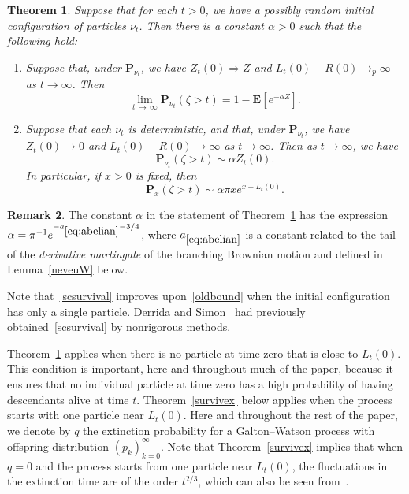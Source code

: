 \documentclass[10pt]{amsart}
\newtheorem{theo}{Theorem}[section]
\theoremstyle{definition}\newtheorem{defi}[theo]{Definition}\newtheorem{rema}[theo]{Remark}\newtheorem{exam}[theo]{Example}\newtheorem{exem}[theo]{Example}\newtheorem{nota}[theo]{Notation}
\newcommand*\E{\mathbf{E}}
\renewcommand*\P{\mathbf{P}}
\newcommand{\1} {\mathds{1}}
\begin{document}
\begin{theo}\label{survival}
Suppose that for each $t > 0$, we have a possibly random initial configuration of particles $\nu_t$. Then there is a constant $\alpha > 0$ such that the following hold:
\begin{enumerate}
\item\label{theo1.1.1} Suppose that, under $\P_{\nu_t}$, we have $Z_t(0) \Rightarrow Z$ and $L_t(0) - R(0) \rightarrow_p \infty$ as $t \rightarrow \infty$. Then
\[
\lim_{t\,\rightarrow\,\infty} \P_{\nu_t}(\zeta > t) = 1 - \E\left[e^{-\alpha Z}\right].
\]

\item\label{theo1.1.2} Suppose that each $\nu_t$ is deterministic, and that, under $\P_{\nu_t}$, we have $Z_t(0) \rightarrow 0$ and $L_t(0) - R(0) \rightarrow \infty$ as $t \rightarrow \infty$. Then as $t \rightarrow \infty$, we have
\[
\P_{\nu_t}(\zeta > t) \sim \alpha Z_t(0).
\]
In particular, if $x > 0$ is fixed, then
\begin{equation}\label{scsurvival}
\P_x(\zeta > t) \sim \alpha \pi x e^{x-L_t(0)}.
\end{equation}
\end{enumerate}
\end{theo}

\begin{rema}
The constant $\alpha$ in the statement of Theorem~\ref{survival} has the expression $\alpha = \pi^{-1}e^{-a_{\eqref{eq:abelian}}-3/4}$, where $a_{\eqref{eq:abelian}}$ is a constant related to the tail of the \emph{derivative martingale} of the branching Brownian motion and defined in Lemma~\ref{neveuW} below.
\end{rema}

Note that~\eqref{scsurvival} improves upon~\eqref{oldbound} when the initial configuration has only a single particle. Derrida and Simon~\cite{ds07} had previously obtained~\eqref{scsurvival} by nonrigorous methods.

Theorem~\ref{survival} applies when there is no particle at time zero that is close to $L_t(0)$. This condition is important, here and throughout much of the paper, because it ensures that no individual particle at time zero has a high probability of having descendants alive at time $t$. Theorem~\ref{survivex} below applies when the process starts with one particle near $L_t(0)$. Here and throughout the rest of the paper, we denote by $q$ the extinction probability for a Galton--Watson process with offspring distribution $(p_k)_{k=0}^{\infty}$. Note that Theorem~\ref{survivex} implies that when $q = 0$ and the process starts from one particle near $L_t(0)$, the fluctuations in the extinction time are of the order $t^{2/3}$, which can also be seen from~\cite[Theorem~2]{bbs}.
\end{document}
